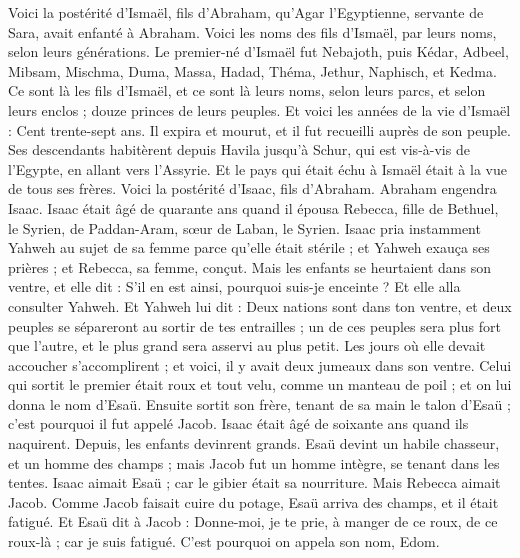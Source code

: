 \begin{multicols}{2}
Voici la postérité d'Ismaël, fils d'Abraham, qu'Agar l'Egyptienne, servante de Sara, avait enfanté à Abraham.
Voici les noms des fils d'Ismaël, par leurs noms, selon leurs générations. Le premier-né d'Ismaël fut Nebajoth, puis Kédar, Adbeel, Mibsam,
Mischma, Duma, Massa,
Hadad, Théma, Jethur, Naphisch, et Kedma.
Ce sont là les fils d'Ismaël, et ce sont là leurs noms, selon leurs parcs, et selon leurs enclos ; douze princes de leurs peuples.
Et voici les années de la vie d'Ismaël : Cent trente-sept ans. Il expira et mourut, et il fut recueilli auprès de son peuple.
Ses descendants habitèrent depuis Havila jusqu'à Schur, qui est vis-à-vis de l'Egypte, en allant vers l'Assyrie. Et le pays qui était échu à Ismaël était à la vue de tous ses frères.
Voici la postérité d'Isaac, fils d'Abraham.
Abraham engendra Isaac. Isaac était âgé de quarante ans quand il épousa Rebecca, fille de Bethuel, le Syrien, de Paddan-Aram, sœur de Laban, le Syrien.
Isaac pria instamment Yahweh au sujet de sa femme parce qu'elle était stérile ; et Yahweh exauça ses prières ; et Rebecca, sa femme, conçut.
Mais les enfants se heurtaient dans son ventre, et elle dit : S'il en est ainsi, pourquoi suis-je enceinte ? Et elle alla consulter Yahweh.
Et Yahweh lui dit : Deux nations sont dans ton ventre, et deux peuples se sépareront au sortir de tes entrailles ; un de ces peuples sera plus fort que l'autre, et le plus grand sera asservi au plus petit.
Les jours où elle devait accoucher s'accomplirent ; et voici, il y avait deux jumeaux dans son ventre.
Celui qui sortit le premier était roux et tout velu, comme un manteau de poil ; et on lui donna le nom d'Esaü.
Ensuite sortit son frère, tenant de sa main le talon d'Esaü ; c'est pourquoi il fut appelé Jacob. Isaac était âgé de soixante ans quand ils naquirent.
Depuis, les enfants devinrent grands. Esaü devint un habile chasseur, et un homme des champs ; mais Jacob fut un homme intègre, se tenant dans les tentes.
Isaac aimait Esaü ; car le gibier était sa nourriture. Mais Rebecca aimait Jacob.
Comme Jacob faisait cuire du potage, Esaü arriva des champs, et il était fatigué.
Et Esaü dit à Jacob : Donne-moi, je te prie, à manger de ce roux, de ce roux-là ; car je suis fatigué. C'est pourquoi on appela son nom, Edom.

\end{multicols}
